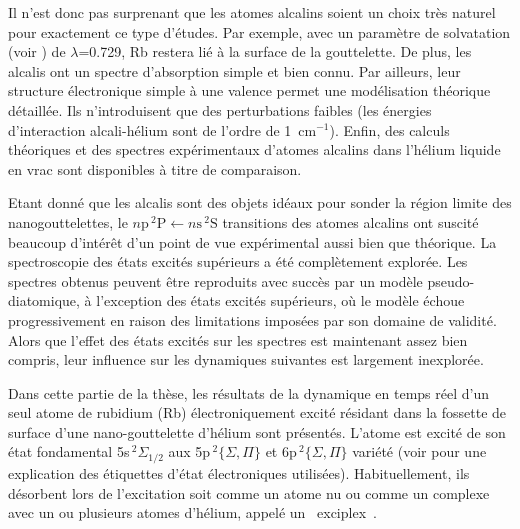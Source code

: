 		Il n'est donc pas surprenant que les atomes alcalins soient un choix très naturel pour exactement ce type d'études. Par exemple, avec un paramètre de solvatation (voir ) de $\lambda$=0.729\citep{Anc95}, Rb restera lié à la surface de la gouttelette. De plus, les alcalis ont un spectre d'absorption simple et bien connu. Par ailleurs, leur structure électronique simple à une valence permet une modélisation théorique détaillée. Ils n'introduisent que des perturbations faibles (les énergies d'interaction alcali-hélium sont de l'ordre de 1~cm$^{-1}$\citep{Pat91}). Enfin, des calculs théoriques\citep{Ancilotto1995-2,Kanorsky1994} et des spectres expérimentaux\citep{Tabbert1995,Takahashi1993,Beijersbergen1993} d'atomes alcalins dans l'hélium liquide en vrac sont disponibles à titre de comparaison.
		
		Etant donné que les alcalis sont des objets idéaux pour sonder la région limite des nanogouttelettes, le $n\mathrm{p}\,^2\mathrm{P}\!\leftarrow\!n\mathrm{s}\,^2\mathrm{S}$ transitions des atomes alcalins ont suscité beaucoup d'intérêt d'un point de vue expérimental aussi bien que théorique. La spectroscopie des états excités supérieurs a été complètement explorée\citep{Log11b,Log11a,Lackner2012,Lackner2013,The11,Fec12,Pif10,Lac11,Theisen2011,Lac13}. Les spectres obtenus peuvent être reproduits avec succès par un modèle pseudo-diatomique, à l'exception des états excités supérieurs, où le modèle échoue progressivement en raison des limitations imposées par son domaine de validité\citep{Sti96,Bunermann2007}. Alors que l'effet des états excités sur les spectres est maintenant assez bien compris, leur influence sur les dynamiques suivantes est largement inexplorée.
		
		Dans cette partie de la thèse, les résultats de la dynamique en temps réel d'un seul atome de rubidium (Rb) électroniquement excité résidant dans la fossette de surface d'une nano-gouttelette d'hélium sont présentés. L'atome est excité de son état fondamental 5s$\,^2\Sigma_{1/2}$ aux 5p$\,^2\{\Sigma,\Pi\}$ et 6p$\,^2\{\Sigma,\Pi\}$ variété (voir  pour une explication des étiquettes d'état électroniques utilisées). Habituellement, ils désorbent lors de l'excitation soit comme un atome nu ou comme un complexe avec un ou plusieurs atomes d'hélium, appelé un \guillemotleft~exciplex~\guillemotright.	
	
